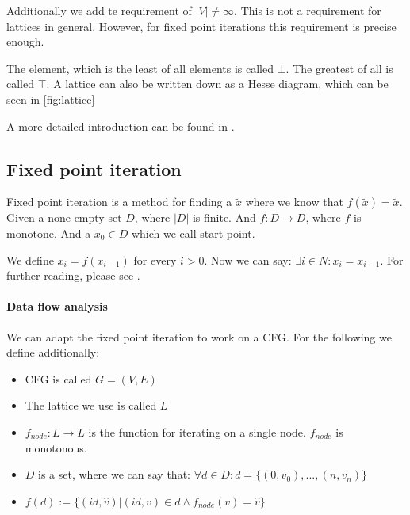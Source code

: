 Additionally we add te requirement of $|V| \not= \infty$. This is not a requirement for lattices in general. However, for fixed point iterations this requirement is precise enough.

The element, which is the least of all elements is called $\bot$. The greatest of all is called $\top$. A lattice can also be written down as a Hesse diagram, which can be seen in \autoref{fig:lattice}

A more detailed introduction can be found in \cite{lattice_theory}.

\subsection{Fixed point iteration}
Fixed point iteration is a method for finding a $\tilde{x}$ where we know that $f(\tilde{x})=\tilde{x}$. \newline
Given a none-empty set $D$, where $|D|$ is finite. And $f: D \rightarrow D$, where $f$ is monotone.
And a $x_0 \in D$ which we call start point.

We define $x_i=f(x_{i-1})$ for every $i > 0$. Now we can say: $\exists i \in N : x_i = x_{i-1}$. For further reading, please see \cite{fixed-point-theory}.


\paragraph{Data flow analysis}
We can adapt the fixed point iteration to work on a CFG. For the following we define additionally:
\begin{itemize}
	\item CFG is called $G=(V,E)$
	\item The lattice we use is called $L$
	\item $f _{node}:L \rightarrow L$ is the function for iterating on a single node. $f _{node}$ is monotonous.
	\item $D$ is a set, where we can say that: $\forall d \in D: d = \{(0, v_0), ... , (n, v_n)\}$
	\item $f(d) := \{(id, \hat{v})| (id, v) \in d \wedge f _{node}(v) = \hat{v}\}$
\end{itemize}

